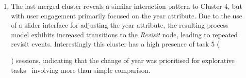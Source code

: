 \documentclass[preprint,journal]{vgtc}            %
\newcommand{\px}{0.0104167in} %
\begin{document}
\begin{enumerate}[noitemsep, topsep=0pt, parsep=0pt ,leftmargin=*]
    \item 
    The last merged cluster reveals a similar interaction pattern to Cluster 4, but with user engagement primarily focused on the year attribute.
    Due to the use of a slider interface for adjusting the year attribute, the resulting process model exhibits increased transitions to the \textit{Revisit} node, leading to repeated revisit events. 
    Interestingly this cluster has a high presence of task 5 (  ) sessions, indicating that the change of year was prioritised for explorative tasks~\cite{Yu25Revealing} involving more than simple comparison. 

\end{enumerate}
\end{document}
